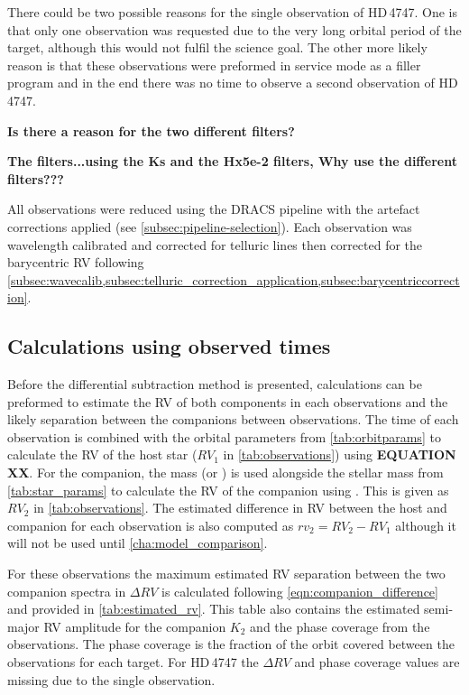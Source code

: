 There could be two possible reasons for the single observation of {HD\,4747}.
One is that only one observation was requested due to the very long orbital period of the target, although this would not fulfil the science goal.
The other more likely reason is that these observations were preformed in service mode as a filler program and in the end there was no time to observe a second observation of {HD\,4747}.

\textbf{Is there a reason for the two different filters?}

\begin{landscape}
    
\end{landscape}

\textbf{The filters...using the {Ks} and the {Hx5e-2} filters, Why use the different filters???}

All observations were reduced using the {DRACS} pipeline with the artefact corrections applied (see \cref{subsec:pipeline-selection}).
Each observation was wavelength calibrated and corrected for telluric lines then corrected for the barycentric RV following  \cref{subsec:wavecalib,subsec:telluric_correction_application,subsec:barycentriccorrection}.


\subsection{Calculations using observed times}
{\red{}
Before the differential subtraction method is presented, calculations can be preformed to estimate the RV of both components in each observations and the likely separation between the companions between observations.
The time of each observation is combined with the orbital parameters from \cref{tab:orbitparams} to calculate the RV of the host star (\({RV}_{1}\) in \cref{tab:observations}) using \textbf{EQUATION XX}.
For the companion, the mass (\Mtwo or \Mtwosini{}) is used alongside the stellar mass from \cref{tab:star_params} to calculate the RV of the companion using .
This is given as \({RV}_{2}\) in \cref{tab:observations}.
The estimated difference in RV between the host and companion for each observation is also computed as \({rv}_{2} = {RV}_{2}-{RV}_{1}\) although it will not be used until \cref{cha:model_comparison}.

For these observations the maximum estimated RV separation between the two companion spectra in  \(\Delta RV\) is calculated following \cref{eqn:companion_difference} and provided in \cref{tab:estimated_rv}.
This table also contains the estimated semi-major RV amplitude for the companion \(K_2\) and the phase coverage from the observations.
The phase coverage is the fraction of the orbit covered between the observations for each target.
For {HD\,4747} the \(\Delta RV\) and phase coverage values are missing due to the single observation.
}

